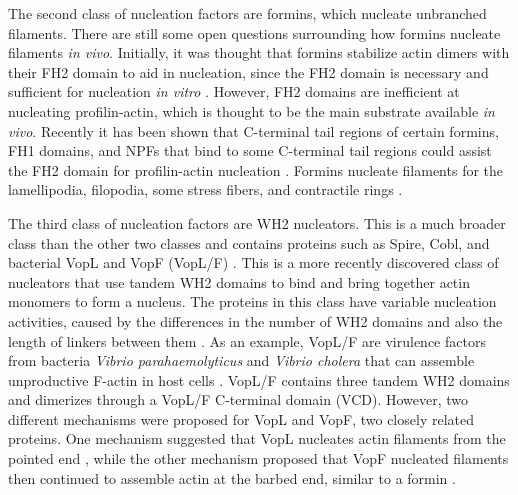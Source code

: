 The second class of nucleation factors are formins, which nucleate unbranched filaments. There are still some open questions surrounding how formins nucleate filaments \textit{in vivo}. Initially, it was thought that formins stabilize actin dimers with their FH2 domain to aid in nucleation, since the FH2 domain is necessary and sufficient for nucleation \textit{in vitro} \citep{zigmond_formin-induced_2004,paul_role_2008,pring_mechanism_2002}. However, FH2 domains are inefficient at nucleating profilin-actin, which is thought to be the main substrate available \textit{in vivo}. Recently it has been shown that C-terminal tail regions of certain formins, FH1 domains, and NPFs that bind to some C-terminal tail regions could assist the FH2 domain for profilin-actin nucleation \citep{breitsprecher_formins_2013}. Formins nucleate filaments for the lamellipodia, filopodia, some stress fibers, and contractile rings \citep{faix_filopodia:_2009,mishra_yeast_2014,blanchoin_actin_2014}.

The third class of nucleation factors are WH2 nucleators. This is a much broader class than the other two classes and contains proteins such as Spire, Cobl, and bacterial VopL and VopF (VopL/F) \citep{quinlan_drosophila_2005, namgoong_mechanism_2011, burke_bacterial_2017,siton-mendelson_functional_2017}. This is a more recently discovered class of nucleators that use tandem WH2 domains to bind and bring together actin monomers to form a nucleus. The proteins in this class have variable nucleation activities, caused by the differences in the number of WH2 domains and also the length of linkers between them \citep{siton-mendelson_functional_2017}. As an example, VopL/F are virulence factors from bacteria \textit{Vibrio parahaemolyticus} and \textit{Vibrio cholera} that can assemble unproductive F-actin in host cells \citep{liverman_arp2/3-independent_2007}. VopL/F contains three tandem WH2 domains and dimerizes through a VopL/F C-terminal domain (VCD). However, two different mechanisms were proposed for VopL and VopF, two closely related proteins. One mechanism suggested that VopL nucleates actin filaments from the pointed end \citep{namgoong_mechanism_2011,yu_mechanism_2011,zahm_bacterial_2013}, while the other mechanism proposed that VopF nucleated filaments then continued to assemble actin at the barbed end, similar to a formin \citep{pernier_dimeric_2013}.

